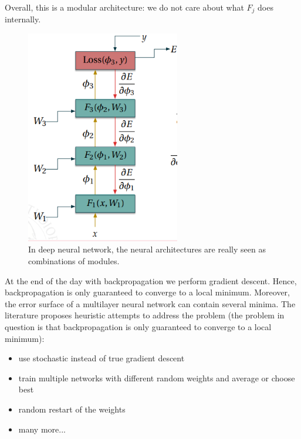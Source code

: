 Overall, this is a modular architecture: we do not care about what $F_{j}$ does
internally.
\newline

\begin{figure}[H]
	\centering
	\includegraphics[width=0.6\textwidth]{
		images/16_DeepLearning_modularStructure.png
	}
	\caption{In deep neural network, the neural architectures are really seen as combinations
	of modules.}
	\label{fig:deep_architectures:modular structure}
\end{figure}

At the end of the day with backpropagation we perform gradient descent. Hence, backpropagation
is only guaranteed to converge to a local minimum. Moreover, the error surface of
a multilayer neural network can contain several minima. The literature proposes
heuristic attempts to address the problem (the problem in question is that backpropagation
is only guaranteed to converge to a local minimum):
\begin{itemize}
	\item use stochastic instead of true gradient descent

	\item train multiple networks with different random weights and average or choose
		best

	\item random restart of the weights

	\item many more...
\end{itemize}

